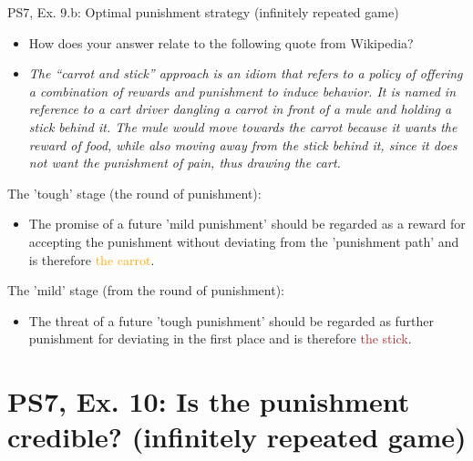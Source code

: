 \begin{frame}{PS7, Ex. 9.b: Optimal punishment strategy (infinitely repeated game)}
  \begin{itemize}
    \item[(b)] How does your answer relate to the following quote from Wikipedia?
    \item[] \textit{The “carrot and stick” approach is an idiom that refers to a policy of offering a combination of rewards and punishment to induce behavior. It is named in reference to a cart driver dangling a carrot in front of a mule and holding a stick behind it. The mule would move towards the carrot because it wants the reward of food, while also moving away from the stick behind it, since it does not want the punishment of pain, thus drawing the cart.}
  \end{itemize}
  \vspace{-4pt}
  \begin{multicols}{2}
    The 'tough' stage (the  round of punishment):
    \begin{itemize}
      \item The promise of a future 'mild punishment' should be regarded as a reward for accepting the punishment without deviating from the 'punishment path' and is therefore \textcolor{orange}{the carrot}.
    \end{itemize}
    \vfill\null\columnbreak
    The 'mild' stage (from the  round of punishment):
    \begin{itemize}
      \item The threat of a future 'tough punishment' should be regarded as further punishment for deviating in the first place and is therefore \textcolor{brown}{the stick}.
    \end{itemize}
    \vfill\null
  \end{multicols}
\end{frame}



\section{PS7, Ex. 10: Is the punishment credible? (infinitely repeated game)}

